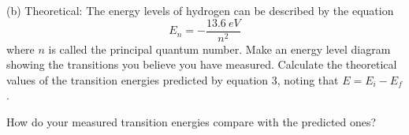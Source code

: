 \newpage

(b)  Theoretical:  The energy levels of hydrogen can be described by the equation
\begin{equation}
E_n = -\frac{13.6~eV}{n^2}
\end{equation}
where $n$ is called the principal quantum number.  Make an energy level diagram showing the transitions you believe you have measured. Calculate the theoretical values of the transition energies predicted by equation 3, noting that $E = E_i - E_f$.

\answerspace{5.0in}

How do your measured transition energies compare with the predicted ones?
\answerspace{1.0in}
